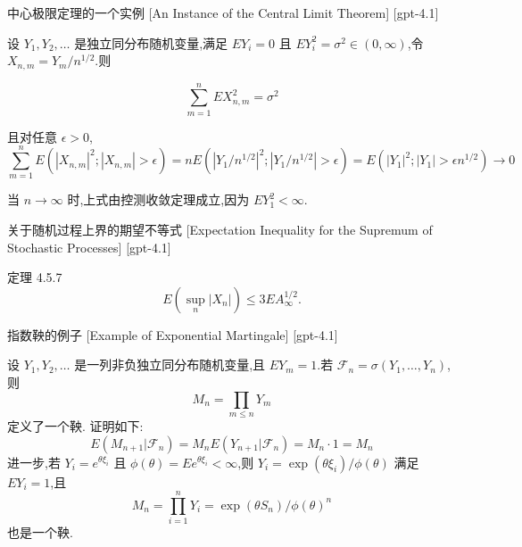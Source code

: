 \documentclass[UTF8]{ctexart}
\begin{document}
    
    
    \begin{thm}
        {中心极限定理的一个实例}
        [An Instance of the Central Limit Theorem]
        [gpt-4.1]
        
设 $Y _ { 1 } , Y _ { 2 } , \ldots$ 是独立同分布随机变量,满足 $E Y _ { i } = 0$ 且 $E Y _ { i } ^ { 2 } = \sigma ^ { 2 } \in ( 0 , \infty )$,令 $X _ { n , m } = Y _ { m } / n ^ { 1 / 2 }$.则

\[
\sum _ { m = 1 } ^ { n } E X _ { n , m } ^ { 2 } = \sigma ^ { 2 }
\]

且对任意 $\epsilon > 0$,
\[
\sum _ { m = 1 } ^ { n } E ( | X _ { n , m } | ^ { 2 } ; | X _ { n , m } | > \epsilon ) = n E ( | Y _ { 1 } / n ^ { 1 / 2 } | ^ { 2 } ; | Y _ { 1 } / n ^ { 1 / 2 } | > \epsilon )
= E ( | Y _ { 1 } | ^ { 2 } ; | Y _ { 1 } | > \epsilon n ^ { 1 / 2 } ) \to 0
\]

当 $n \to \infty$ 时,上式由控测收敛定理成立,因为 $E Y _ { 1 } ^ { 2 } < \infty$.

    \end{thm}
    
    
    
    \begin{thm}
        {关于随机过程上界的期望不等式}
        [Expectation Inequality for the Supremum of Stochastic Processes]
        [gpt-4.1]
        
定理 4.5.7
\[
E \left( \sup_n |X_n| \right) \leq 3 E A_{\infty}^{1/2}.
\]

    \end{thm}
    
    
    
    \begin{xmp}
        {指数鞅的例子}
        [Example of Exponential Martingale]
        [gpt-4.1]
        
设 $Y _ { 1 } , Y _ { 2 } , \ldots$ 是一列非负独立同分布随机变量,且 $E Y _ { m } = 1$.若 $\mathcal { F } _ { n } = \sigma ( Y _ { 1 } , \ldots , Y _ { n } )$,则
\[
M _ { n } = \prod _ { m \leq n } Y _ { m }
\]
定义了一个鞅.
证明如下:
\[
E ( M _ { n + 1 } | \mathcal { F } _ { n } ) = M _ { n } E ( Y _ { n + 1 } | \mathcal { F } _ { n } ) = M _ { n } \cdot 1 = M _ { n }
\]
进一步,若 $Y _ { i } = e ^ { \theta \xi _ { i } }$ 且 $\phi ( \theta ) = E e ^ { \theta \xi _ { i } } < \infty$,则 $Y _ { i } = \exp ( \theta \xi _ { i } ) / \phi ( \theta )$ 满足 $E Y _ { i } = 1$,且
\[
M _ { n } = \prod _ { i = 1 } ^ { n } Y _ { i } = \exp ( \theta S _ { n } ) / \phi ( \theta ) ^ { n }
\]
也是一个鞅.

    \end{xmp}
    
\end{document}
